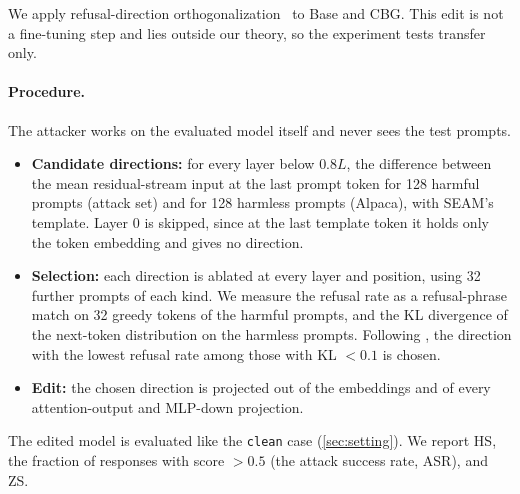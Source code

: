 \documentclass[11pt]{article}
\begin{document}
We apply refusal-direction orthogonalization~\citep{arditi2024refusal} to Base and CBG. This edit is not a fine-tuning step and lies outside our theory, so the experiment tests transfer only.

\paragraph{Procedure.}
The attacker works on the evaluated model itself and never sees the test prompts.
\begin{itemize}
  \item \textbf{Candidate directions:} for every layer below $0.8L$, the difference between the mean residual-stream input at the last prompt token for 128 harmful prompts (attack set) and for 128 harmless prompts (Alpaca), with SEAM's template. Layer 0 is skipped, since at the last template token it holds only the token embedding and gives no direction.
  \item \textbf{Selection:} each direction is ablated at every layer and position, using 32 further prompts of each kind. We measure the refusal rate as a refusal-phrase match on 32 greedy tokens of the harmful prompts, and the KL divergence of the next-token distribution on the harmless prompts. Following \citet{arditi2024refusal}, the direction with the lowest refusal rate among those with KL $<0.1$ is chosen.
  \item \textbf{Edit:} the chosen direction is projected out of the embeddings and of every attention-output and MLP-down projection.
\end{itemize}
The edited model is evaluated like the \texttt{clean} case (\cref{sec:setting}). We report HS, the fraction of responses with score $>0.5$ (the attack success rate, ASR), and ZS.

\begin{table}[t]
\centering
\small
\caption{Refusal-direction orthogonalization (one run per model). Refusal: validation refusal rate (\%) before and after the edit. KL: harmless next-token KL of the chosen direction.}
\label{tab:orthogonal}
\end{table}
\end{document}
